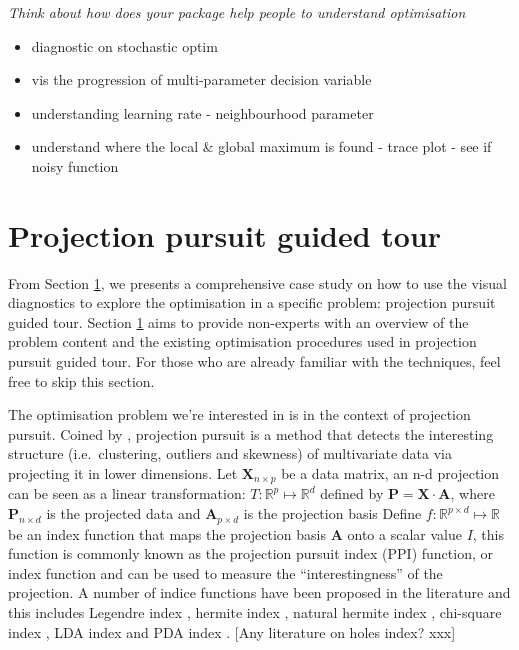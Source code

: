 \documentclass[12pt]{article}
\providecommand{\tightlist}{%
  \setlength{\itemsep}{0pt}\setlength{\parskip}{0pt}}
\begin{document}
\emph{Think about how does your package help people to understand
optimisation}

\begin{itemize}
\tightlist
\item
  diagnostic on stochastic optim
\item
  vis the progression of multi-parameter decision variable
\item
  understanding learning rate - neighbourhood parameter
\item
  understand where the local \& global maximum is found - trace plot -
  see if noisy function
\end{itemize}

\hypertarget{tour}{%
\section{Projection pursuit guided tour}\label{tour}}

From Section \ref{tour}, we presents a comprehensive case study on how
to use the visual diagnostics to explore the optimisation in a specific
problem: projection pursuit guided tour. Section \ref{tour} aims to
provide non-experts with an overview of the problem content and the
existing optimisation procedures used in projection pursuit guided tour.
For those who are already familiar with the techniques, feel free to
skip this section.

The optimisation problem we're interested in is in the context of
projection pursuit. Coined by \citet{friedman1974projection}, projection
pursuit is a method that detects the interesting structure
(i.e.~clustering, outliers and skewness) of multivariate data via
projecting it in lower dimensions. Let \(\mathbf{X}_{n \times p}\) be a
data matrix, an n-d projection can be seen as a linear transformation:
\(T: \mathbb{R}^p \mapsto \mathbb{R}^d\) defined by
\(\mathbf{P} = \mathbf{X} \cdot \mathbf{A}\), where
\(\mathbf{P}_{n \times d}\) is the projected data and
\(\mathbf{A}_{p\times d}\) is the projection basis Define
\(f: \mathbb{R}^{p \times d} \mapsto \mathbb{R}\) be an index function
that maps the projection basis \(\mathbf{A}\) onto a scalar value \(I\),
this function is commonly known as the projection pursuit index (PPI)
function, or index function and can be used to measure the
``interestingness'' of the projection. A number of indice functions have
been proposed in the literature and this includes Legendre index
\citep{friedman1974projection}, hermite index
\citep{hall1989polynomial}, natural hermite index
\citep{cook1993projection}, chi-square index
\citep{posse1995projection}, LDA index \citep{lee2005projection} and PDA
index \citep{lee2010projection}. {[}Any literature on holes index?
xxx{]}
\end{document}
